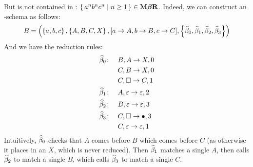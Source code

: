 \documentclass{llncs}
\begin{document}
But \MBR{} is not contained in \CFL{}: $\set{a^nb^nc^n}[n\geq1]\in\MBR$.
Indeed, we can construct an \MBR-schema as follows:
\[ B = \parens{\set{a,b,c},\set{A,B,C,X},[a\to A,b\to B,c\to C],\set{\hb_0,\hb_1,\hb_2,\hb_3}} \]
And we have the reduction rules:
\begin{align*}
    \widehat\beta_0\colon\quad& B,A\to X,0\\
        &C,B\to X,0\\
        &C,\square\to C,1\\
    \widehat\beta_1\colon\quad& A,\varepsilon\to\varepsilon,2\\
    \widehat\beta_2\colon\quad& B,\varepsilon\to\varepsilon,3\\
    \widehat\beta_3\colon\quad& C,\square\to\bullet,3\\
        &C,\varepsilon\to\varepsilon,1
\end{align*}
Intuitively, $\widehat\beta_0$ checks that $A$ comes before $B$ which comes before $C$ (as otherwise it places in an $X$, which is never reduced).
Then $\widehat\beta_1$ matches a single $A$, then calls $\widehat\beta_2$ to match a single $B$, which calls $\widehat\beta_3$ to match a single $C$.



\end{document}

